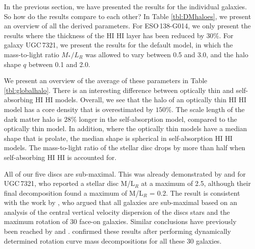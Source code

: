 \documentclass[useAMS,usenatbib]{mn2e}
\newcommand{\hi}{%
  \relax
  \ifmmode
    \textrm{\textsc{HI}}
  \else
    \textsc{H{\smaller}I}
  \fi
}
\begin{document}
In the previous section, we have presented the results for the individual 
galaxies. 
So how do the results compare to each other? 
In Table \ref{tbl:DMhaloes}, we present an overview of all the derived 
parameters. 
For ESO\,138-G014, we only present the results where the thickness of 
the \hi layer has been reduced by 30\%.
For galaxy UGC\,7321, we present the results for the default model, in 
which the mass-to-light ratio $M_*/L_R$ was allowed to vary between 0.5 
and 3.0, and the halo shape $q$ between 0.1 and 2.0.


We present an overview of the average of these parameters in Table 
\ref{tbl:globalhalo}. 
There is an interesting difference between optically thin and 
self-absorbing \hi models. 
Overall, we see that the halo of an optically thin \hi model 
has a core density that is overestimated by $150\%$.
The scale length of the dark matter halo is $28\%$ longer in 
the self-absorption model, compared to the optically thin model. 
In addition, where the optically thin models have a median shape 
that is prolate, the median shape is spherical in self-absorption \hi models.
The mass-to-light ratio of the stellar disc drops by more than 
half when self-absorbing \hi is accounted for. 

All of our five discs are sub-maximal.
This was already demonstrated by \citet{OBrien2010D} and 
\citet{Banerjee2010A} for UGC\,7321, who reported a stellar 
disc M/L$_R$ at a maximum of 2.5, although their final 
decomposition found a maximum of M/L$_R$ = 0.2. 
The result is consistent with the work by \citet{Bershady2011A}, 
who argued that all galaxies are sub-maximal based on an analysis 
of the central vertical velocity dispersion of the discs stars and 
the maximum rotation of 30 face-on galaxies.
Similar conclusions have previously been reached by \citet{bot97} 
and \citet{Kregel2005}.
\citet{Martinsson2013A} confirmed these results after performing 
dynamically determined rotation curve mass decompositions for all 
these 30 galaxies.
\end{document}
